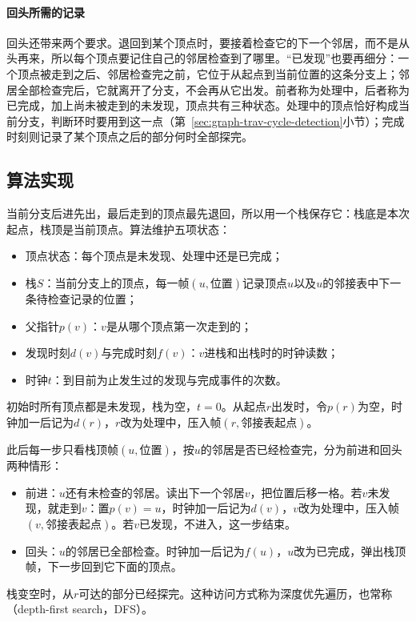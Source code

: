 \paragraph{回头所需的记录}
回头还带来两个要求。退回到某个顶点时，要接着检查它的下一个邻居，而不是从头再来，所以每个顶点要记住自己的邻居检查到了哪里。“已发现”也要再细分：一个顶点被走到之后、邻居检查完之前，它位于从起点到当前位置的这条分支上；邻居全部检查完后，它就离开了分支，不会再从它出发。前者称为处理中，后者称为已完成，加上尚未被走到的未发现，顶点共有三种状态。处理中的顶点恰好构成当前分支，判断环时要用到这一点（第~\ref{sec:graph-trav-cycle-detection}小节）；完成时刻则记录了某个顶点之后的部分何时全部探完。

\subsection{算法实现}
\label{sec:graph-trav-dfs-stack}

当前分支后进先出，最后走到的顶点最先退回，所以用一个栈保存它：栈底是本次起点，栈顶是当前顶点。算法维护五项状态：
\begin{itemize}
  \item 顶点状态：每个顶点是未发现、处理中还是已完成；
  \item 栈$S$：当前分支上的顶点，每一帧$(u,\text{位置})$记录顶点$u$以及$u$的邻接表中下一条待检查记录的位置；
  \item 父指针$p(v)$：$v$是从哪个顶点第一次走到的；
  \item 发现时刻$d(v)$与完成时刻$f(v)$：$v$进栈和出栈时的时钟读数；
  \item 时钟$t$：到目前为止发生过的发现与完成事件的次数。
\end{itemize}

初始时所有顶点都是未发现，栈为空，$t=0$。从起点$r$出发时，令$p(r)$为空，时钟加一后记为$d(r)$，$r$改为处理中，压入帧$(r,\text{邻接表起点})$。

此后每一步只看栈顶帧$(u,\text{位置})$，按$u$的邻居是否已经检查完，分为前进和回头两种情形：
\begin{itemize}
  \item 前进：$u$还有未检查的邻居。读出下一个邻居$v$，把位置后移一格。若$v$未发现，就走到$v$：置$p(v)=u$，时钟加一后记为$d(v)$，$v$改为处理中，压入帧$(v,\text{邻接表起点})$。若$v$已发现，不进入，这一步结束。
  \item 回头：$u$的邻居已全部检查。时钟加一后记为$f(u)$，$u$改为已完成，弹出栈顶帧，下一步回到它下面的顶点。
\end{itemize}

栈变空时，从$r$可达的部分已经探完。这种访问方式称为深度优先遍历，也常称（depth-first search，DFS）。

